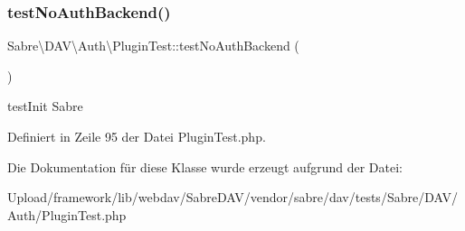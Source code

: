 \subsubsection{\texorpdfstring{test\+No\+Auth\+Backend()}{testNoAuthBackend()}}
{\footnotesize\ttfamily Sabre\textbackslash{}\+D\+A\+V\textbackslash{}\+Auth\textbackslash{}\+Plugin\+Test\+::test\+No\+Auth\+Backend (\begin{DoxyParamCaption}{ }\end{DoxyParamCaption})}

test\+Init  Sabre 

Definiert in Zeile 95 der Datei Plugin\+Test.\+php.



Die Dokumentation für diese Klasse wurde erzeugt aufgrund der Datei\+:\begin{DoxyCompactItemize}
\item 
Upload/framework/lib/webdav/\+Sabre\+D\+A\+V/vendor/sabre/dav/tests/\+Sabre/\+D\+A\+V/\+Auth/Plugin\+Test.\+php\end{DoxyCompactItemize}
